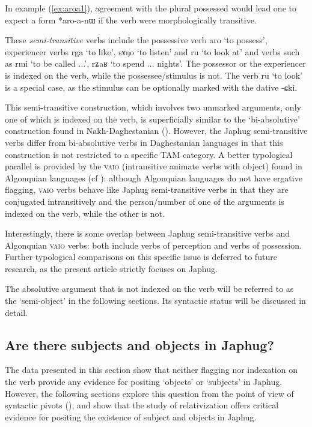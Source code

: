 \documentclass[oldfontcommands,oneside,a4paper,11pt]{article}
\newcommand{\ipa}[1]{{\phon #1}} %
\newcommand{\refb}[1]{(\ref{#1})}
\begin{document}
 
In example \refb{ex:aroa1}, agreement with the plural possessed would lead one to expect a form *\ipa{aro-a-nɯ} if the verb were morphologically transitive.
  

  These  \textit{semi-transitive} verbs   include the possessive verb \ipa{aro} `to possess',  experiencer verbs \ipa{rga} `to like', \ipa{sɤŋo} `to listen' and \ipa{ru} `to look at' and verbs such as \ipa{rmi} `to be called ...', \ipa{rʑaʁ} `to spend ... nights'. The possessor or the experiencer is indexed on the verb, while the possessee/stimulus is not. The verb \ipa{ru} `to look' is a special case, as the stimulus can be optionally marked with the dative \ipa{-ɕki}. 

This semi-transitive construction, which involves two unmarked arguments, only one of which is indexed on the verb, is superficially similar to the `bi-absolutive' construction found in Nakh-Daghestanian (\citealt{forker12biabsolutive}). However, the Japhug semi-transitive verbs differ from bi-absolutive verbs in Daghestanian languages in that this construction is not restricted to a specific TAM category. A better typological parallel is provided by the  \textsc{vaio} (intransitive animate verbs with object) found in Algonquian languages (cf  \citealt[242]{valentine01grammar}): although Algonquian languages do not have ergative flagging, \textsc{vaio} verbs behave like Japhug semi-transitive verbs in that they are conjugated intransitively and the person/number of one of the arguments is indexed on the verb, while the other is not.

Interestingly, there is some overlap between Japhug semi-transitive verbs and Algonquian \textsc{vaio} verbs: both include verbs of perception and verbs of possession. Further typological comparisons on this specific issue is deferred to future research, as the present article strictly focuses on Japhug.

The absolutive argument that is not indexed on the verb will be referred to as the `semi-object' in the following sections. Its  syntactic status will be discussed in detail.

\subsection{Are there subjects and objects in Japhug?}
The data presented in this section show that neither flagging nor indexation on the verb provide any evidence for positing `objects' or `subjects' in Japhug. However, the following sections explore this question from the point of view of syntactic pivots (\citealt[275]{vanvalin97syntax}), and show that the study of relativization offers critical evidence for positing the existence of subject and objects in Japhug.
\end{document}
